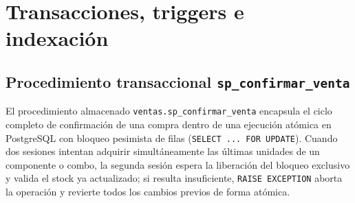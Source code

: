 
\section{Transacciones, triggers e indexaci\'on}

\subsection{Procedimiento transaccional \texttt{sp\_confirmar\_venta}}

El procedimiento almacenado \texttt{ventas.sp\_confirmar\_venta} encapsula el ciclo completo de confirmaci\'on de una compra dentro de una ejecuci\'on at\'omica en PostgreSQL con bloqueo pesimista de filas (\texttt{SELECT ... FOR UPDATE}).
Cuando dos sesiones intentan adquirir simult\'aneamente las \'ultimas unidades de un componente o combo, la segunda sesi\'on espera la liberaci\'on del bloqueo exclusivo y valida el stock ya actualizado; si resulta insuficiente, \texttt{RAISE EXCEPTION} aborta la operaci\'on y revierte todos los cambios previos de forma at\'omica.

